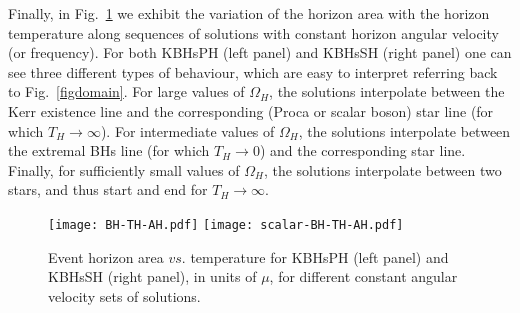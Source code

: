Finally, in Fig.~\ref{temperature} we exhibit the variation of the horizon area with the horizon temperature along sequences of solutions with constant horizon angular velocity (or frequency). For both KBHsPH (left panel) and KBHsSH (right panel) one can see three different types of behaviour, which are easy to interpret referring back to Fig.~\ref{figdomain}. For large values of $\Omega_H$, the solutions interpolate between the Kerr existence line and the corresponding (Proca or scalar boson) star line (for which $T_H\rightarrow \infty$). For intermediate values of $\Omega_H$, the solutions interpolate between the extremal BHs line (for which $T_H\rightarrow 0$) and the corresponding star line. Finally, for sufficiently small values of $\Omega_H$, the solutions interpolate between two stars, and thus start and end for $T_H\rightarrow \infty$.


\begin{figure}[h!]
  \begin{center}
    \texttt{[image: BH-TH-AH.pdf]}
      \texttt{[image: scalar-BH-TH-AH.pdf]}
  \end{center}
 \caption{Event horizon area $vs.$ temperature for KBHsPH (left panel) and KBHsSH (right panel), in units of $\mu$, for different constant angular velocity sets of solutions.}
  \label{temperature}
\end{figure}






